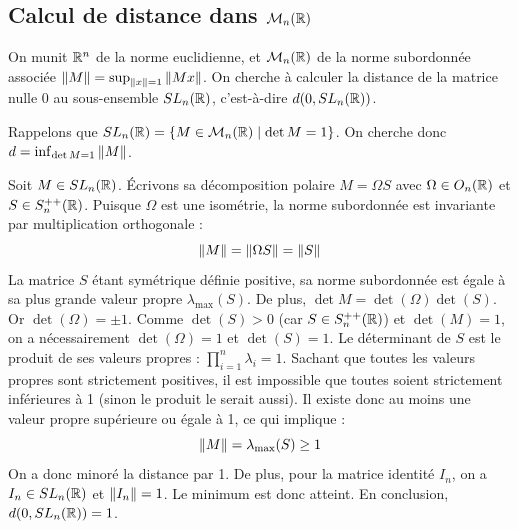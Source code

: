 \begin{center}
\end{center}

\subsection{Calcul de distance dans \texorpdfstring{$\mathcal{M}_n(\mathbb{R})$}{Mn(R)}}

On munit $\mathbb{R}^n$ de la norme euclidienne, et $\mathcal{M}_n(\mathbb{R})$ de la norme subordonnée associée $\left\|M\right\| = \sup_{\left\|x\right\|=1} \left\|Mx\right\|$.
On cherche à calculer la distance de la matrice nulle $0$ au sous-ensemble $SL_n(\mathbb{R})$, c'est-à-dire $d(0, SL_n(\mathbb{R}))$.

Rappelons que $SL_n(\mathbb{R}) = \{ M \in \mathcal{M}_n(\mathbb{R}) \mid \det M = 1 \}$.
On cherche donc $d = \inf_{\det M = 1} \left\|M\right\|$.

\lvspace \avspace {}

Soit $M \in SL_n(\mathbb{R})$. Écrivons sa décomposition polaire $M = \Omega S$ avec $\Omega \in O_n(\mathbb{R})$ et $S \in S_n^{++}(\mathbb{R})$.
Puisque $\Omega$ est une isométrie, la norme subordonnée est invariante par multiplication orthogonale :
\[ \left\|M\right\| = \left\|\Omega S\right\| = \left\|S\right\| \]
La matrice $S$ étant symétrique définie positive, sa norme subordonnée est égale à sa plus grande valeur propre $\lambda_{\text{max}}(S)$.
De plus, $\det M = \det(\Omega) \det(S)$. Or $\det(\Omega) = \pm 1$. Comme $\det(S) > 0$ (car $S \in S_n^{++}(\mathbb{R})$) et $\det(M) = 1$, on a nécessairement $\det(\Omega) = 1$ et $\det(S) = 1$.
Le déterminant de $S$ est le produit de ses valeurs propres : $\prod_{i=1}^n \lambda_i = 1$.
Sachant que toutes les valeurs propres sont strictement positives, il est impossible que toutes soient strictement inférieures à 1 (sinon le produit le serait aussi).
Il existe donc au moins une valeur propre supérieure ou égale à 1, ce qui implique :
\[ \left\|M\right\| = \lambda_{\text{max}}(S) \ge 1 \]
On a donc minoré la distance par 1.
De plus, pour la matrice identité $I_n$, on a $I_n \in SL_n(\mathbb{R})$ et $\left\|I_n\right\| = 1$.
Le minimum est donc atteint.
En conclusion, $d(0, SL_n(\mathbb{R})) = 1$.

